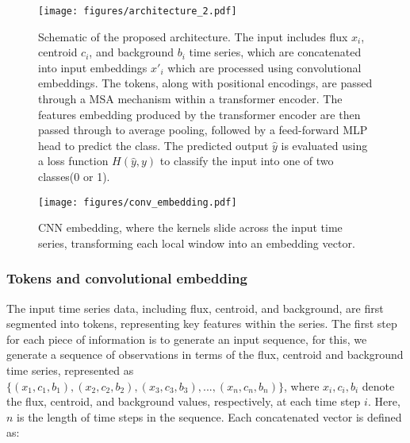 \begin{figure*}
\begin{center}
\vspace{5mm}
\texttt{[image: figures/architecture\_2.pdf]}
\vspace{2mm} 
\caption{\label{fig:architecture}
Schematic of the proposed architecture. The input includes flux $x_i$, centroid $c_i$, and background $b_i$ time series,  which are concatenated into input embeddings $x'_i$ which are processed using convolutional embeddings. The tokens, along with positional encodings, are passed through a MSA mechanism within a transformer encoder. The features embedding produced by the transformer encoder are then passed through to average pooling, followed by a feed-forward MLP head to predict the class. The predicted output $\hat{y}$ is evaluated using a loss function $H(\hat{y}, y)$ to classify the input into one of two classes(0 or 1).}
\vspace{-1mm}
\end{center}
\end{figure*}

\begin{figure}
\begin{center}
\vspace{5mm}
\texttt{[image: figures/conv\_embedding.pdf]}
\vspace{-2mm} 
\caption{\label{fig:cnn_embedding}
CNN embedding, where the kernels slide across the input time series, transforming each local window into an embedding vector. }
\vspace{-1mm}
\end{center}
\end{figure}

\subsubsection{Tokens and convolutional embedding}
\label{sec:inputembedding}
The input time series data, including flux, centroid, and background, are first segmented into tokens, representing key features within the series.
The first step for each piece of information is to generate an input sequence, for this, we generate a sequence of observations in terms of the flux, centroid and background time series, represented as $\{(x_1, c_1, b_1), (x_2, c_2, b_2), (x_3, c_3, b_3), ..., (x_n, c_n, b_n)\}$, where $x_i, c_i, b_i$ denote the flux, centroid, and background values, respectively, at each time step $i$. Here, $n$ is the length of time steps in the sequence. Each concatenated vector is defined as: 

